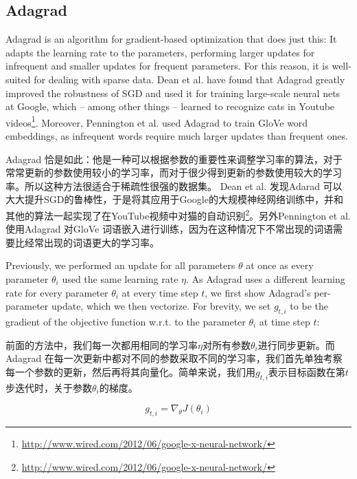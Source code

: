 \documentclass{article}
\begin{document}
\subsection{Adagrad}

Adagrad \cite{Duchi2011} is an algorithm for gradient-based optimization that does just this: It adapts the learning rate to the parameters, performing larger updates for infrequent and smaller updates for frequent parameters. For this reason, it is well-suited for dealing with sparse data. Dean et al. \cite{Dean2012} have found that Adagrad greatly improved the robustness of SGD and used it for training large-scale neural nets at Google, which -- among other things -- learned to recognize cats in Youtube videos\footnote{\url{http://www.wired.com/2012/06/google-x-neural-network/}}. Moreover, Pennington et al. \cite{Pennington2014} used Adagrad to train GloVe word embeddings, as infrequent words require much larger updates than frequent ones.

Adagrad \cite{Duchi2011} 恰是如此：他是一种可以根据参数的重要性来调整学习率的算法，对于常常更新的参数使用较小的学习率，而对于很少得到更新的参数使用较大的学习率。所以这种方法很适合于稀疏性很强的数据集。 Dean et al. \cite{Dean2012} 发现Adarad 可以大大提升SGD的鲁棒性，于是将其应用于Google的大规模神经网络训练中，并和其他的算法一起实现了在YouTube视频中对猫的自动识别\footnote{\url{http://www.wired.com/2012/06/google-x-neural-network/}}。另外Pennington et al. \cite{Pennington2014}使用Adagrad 对GloVe 词语嵌入进行训练，因为在这种情况下不常出现的词语需要比经常出现的词语更大的学习率。

Previously, we performed an update for all parameters $\theta$ at once as every parameter $\theta_i$ used the same learning rate $\eta$. As Adagrad uses a different learning rate for every parameter $\theta_i$ at every time step $t$, we first show Adagrad's per-parameter update, which we then vectorize. For brevity, we set $g_{t, i}$ to be the gradient of the objective function w.r.t. to the parameter $\theta_i$ at time step $t$:

前面的方法中，我们每一次都用相同的学习率$\eta$对所有参数$\theta_i$进行同步更新。而Adagrad 在每一次更新中都对不同的参数采取不同的学习率，我们首先单独考察每一个参数的更新，然后再将其向量化。简单来说，我们用$g_{t, i}$表示目标函数在第$t$步迭代时，关于参数$\theta_i$的梯度。

\begin{equation}
g_{t, i} = \nabla_\theta J( \theta_i )
\end{equation}
\end{document}

